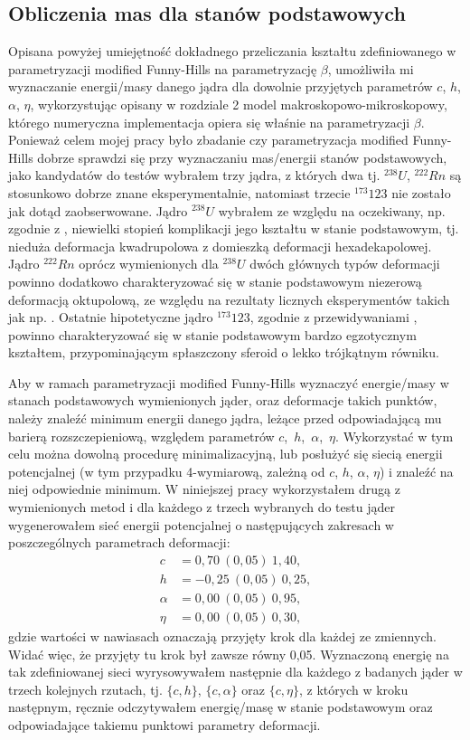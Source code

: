 \documentclass[a4paper,polish]{article}
\numberwithin{equation}{section}
\begin{document}
\clearpage
\subsection{Obliczenia mas dla stanów podstawowych}

Opisana powyżej umiejętność dokładnego przeliczania kształtu zdefiniowanego w parametryzacji modified Funny-Hills na parametryzację $\beta$, umożliwiła mi wyznaczanie energii/masy danego jądra dla dowolnie przyjętych parametrów $c$, $h$, $\alpha$, $\eta$, wykorzystując opisany w rozdziale 2 model makroskopowo-mikroskopowy, którego numeryczna implementacja opiera się właśnie na parametryzacji $\beta$. Ponieważ celem mojej pracy było zbadanie czy parametryzacja modified Funny-Hills dobrze sprawdzi się przy wyznaczaniu mas/energii stanów podstawowych, jako kandydatów do testów wybrałem trzy jądra, z których dwa tj. $^{238}U$, $^{222}Rn$ są stosunkowo dobrze znane eksperymentalnie, natomiast trzecie $^{173}123$ nie zostało jak dotąd zaobserwowane. Jądro $^{238}U$ wybrałem ze względu na oczekiwany, np. zgodnie z \cite{RIPL3}, niewielki stopień komplikacji jego kształtu w stanie podstawowym, tj. nieduża deformacja kwadrupolowa z domieszką deformacji hexadekapolowej. Jądro $^{222}Rn$ oprócz wymienionych dla $^{238}U$ dwóch głównych typów deformacji powinno dodatkowo charakteryzować się w stanie podstawowym niezerową deformacją oktupolową, ze względu na rezultaty licznych eksperymentów takich jak np. \cite{E3}. Ostatnie hipotetyczne jądro $^{173}123$, zgodnie z przewidywaniami \cite{A32}, powinno charakteryzować się w stanie podstawowym bardzo egzotycznym kształtem, przypominającym spłaszczony sferoid o lekko trójkątnym równiku. 

Aby w ramach parametryzacji modified Funny-Hills wyznaczyć energie/masy w stanach podstawowych wymienionych jąder, oraz deformacje takich punktów, należy znaleźć minimum energii danego jądra, leżące przed odpowiadającą mu barierą rozszczepieniową, względem parametrów $c$,~$h$,~$\alpha$,~$\eta$. Wykorzystać w tym celu można dowolną procedurę minimalizacyjną, lub posłużyć się siecią energii potencjalnej (w tym przypadku 4-wymiarową, zależną od $c$, $h$, $\alpha$, $\eta$) i znaleźć na niej odpowiednie minimum. W niniejszej pracy wykorzystałem drugą z wymienionych metod i dla każdego z trzech wybranych do testu jąder wygenerowałem sieć energii potencjalnej o następujących zakresach w poszczególnych parametrach deformacji:
\begin{align*}
c&=0,70~(0,05)~1,40,\\
h&=-0,25~(0,05)~0,25,\\
\alpha&=0,00~(0,05)~0,95,\\
\eta&=0,00~(0,05)~0,30,
\end{align*}
gdzie wartości w nawiasach oznaczają przyjęty krok dla każdej ze zmiennych. Widać więc, że przyjęty tu krok był zawsze równy 0,05. Wyznaczoną energię na tak zdefiniowanej sieci wyrysowywałem następnie dla każdego z badanych jąder w trzech kolejnych rzutach, tj. $\{c,h\}$, $\{c, \alpha\}$ oraz $\{c, \eta\}$, z których w kroku następnym, ręcznie odczytywałem energię/masę w stanie podstawowym oraz odpowiadające takiemu punktowi parametry deformacji.
\end{document}
